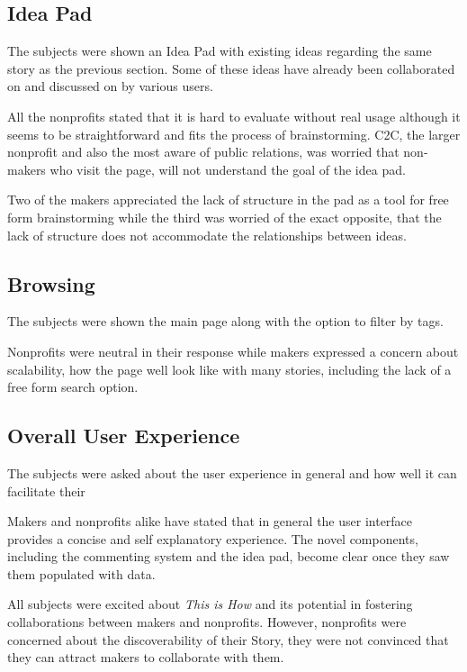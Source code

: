 \subsection{Idea Pad}

The subjects were shown an Idea Pad with existing ideas regarding the same story as the previous section. Some of these ideas have already been collaborated on and discussed on by various users.

All the nonprofits stated that it is hard to evaluate without real usage although it seems to be straightforward and fits the process of brainstorming. C2C, the larger nonprofit and also the most aware of public relations, was worried that non-makers who visit the page, will not understand the goal of the idea pad.   

Two of the makers appreciated the lack of structure in the pad as a tool for free form brainstorming while the third was worried of the exact opposite, that the lack of structure does not accommodate the relationships between ideas.

\subsection{Browsing}

The subjects were shown the main page along with the option to filter by tags.

Nonprofits were neutral in their response while makers expressed a concern about scalability, how the page well look like with many stories, including the lack of a free form search option.

\subsection{Overall User Experience}
The subjects were asked about the user experience in general and how well it can facilitate their  

Makers and nonprofits alike have stated that in general the user interface provides a concise and self explanatory experience. The novel components, including the commenting system and the idea pad, become clear once they saw them populated with data.     

All subjects were excited about \textit{This is How} and its potential in fostering collaborations between makers and nonprofits. However, nonprofits were concerned about the discoverability of their Story, they were not convinced that they can attract makers to collaborate with them.     

